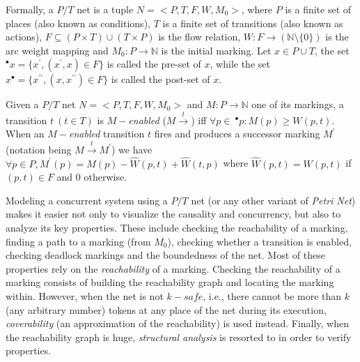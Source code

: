 Formally, a $P/T \mbox{ net}$ is a tuple $N=<P,T,F,W,M_0>$, where $P$ is a finite set of places (also known as
conditions), $T$ is a finite set of transitions (also known as actions), $F\subseteq (P\times T)\cup (T\times P)$ is the
flow relation, $W: F\rightarrow (\mathbb{N}\setminus\{0\})$ is the arc weight mapping and $M_0: P\rightarrow \mathbb{N}$
is the initial marking. Let $x\in P\cup T$, the set $^\bullet x=\{x^\prime, (x^\prime,x)\in F\}$ is called the pre-set of
$x$, while the set $x^\bullet=\{x^{\prime\prime}, (x, x^{\prime\prime})\in F\}$ is called the post-set of $x$.

Given a $P/T$ net $N=<P,T,F,W,M_0>$ and $M: P\rightarrow\mathbb{N}$ one of its markings, a transition $t~(t\in T)$ is
$M-$\emph{enabled} ($M\overset{t}{\rightarrow}$) iff $\forall p\in~ ^\bullet p: M(p)\geq W(p,t)$. When an
$M-$\emph{enabled} transition $t$ fires and produces a successor marking $M^\prime$ (notation being
$M\overset{t}{\rightarrow}M^\prime$) we have $\forall p\in P, M^\prime(p)=M(p)-\hat{W}(p,t)+\hat{W}(t,p)$ where
$\hat{W}(p,t)=W(p,t)$ if $(p,t)\in F$ and $0$ otherwise.

Modeling a concurrent system using a $P/T$ net (or any other variant of \emph{Petri Net}) makes it easier not only to
visualize the causality and concurrency, but also to analyze its key properties. These include checking the reachability
of a marking, finding a path to a marking (from $M_0$), checking whether a transition is enabled, checking deadlock
markings and the boundedness of the net. Most of these properties rely on the \emph{reachability} of a marking. Checking
the reachability of a marking consists of building the reachability graph and locating the marking within. However, when
the net is not $k-safe$, i.e., there cannot be more than $k$ (any arbitrary number) tokens at any place of the net during
its execution, \emph{coverability} (an approximation of the reachability) is used instead. Finally, when the reachability
graph is huge, \emph{structural analysis} is resorted to in order to verify properties.


